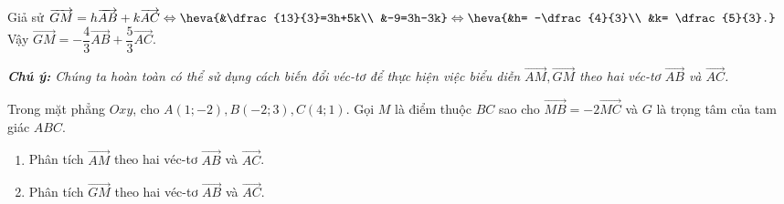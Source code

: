\begin{bt}
{\begin{enumerate}
        Giả sử $\overrightarrow{GM} = h\overrightarrow{AB}+k\overrightarrow{AC} \Leftrightarrow \heva{&\dfrac{13}{3}=3h+5k\\ &-9=3h-3k} \Leftrightarrow \heva{&h= -\dfrac{4}{3}\\ &k= \dfrac{5}{3}.}$\\
        Vậy $\overrightarrow{GM} = -\dfrac{4}{3}\overrightarrow{AB}+\dfrac{5}{3}\overrightarrow{AC}$.
    \end{enumerate} 
    \textit{\textbf{Chú ý:} Chúng ta hoàn toàn có thể sử dụng cách biến đổi véc-tơ để thực hiện việc biểu diễn $\overrightarrow{AM},\overrightarrow{GM}$ theo hai véc-tơ $\overrightarrow{AB}$ và $\overrightarrow{AC}$.}
	}
\end{bt}

\begin{bt}%
	Trong mặt phẳng $Oxy$, cho $A\left(1; -2\right), B\left(-2; 3\right), C\left(4; 1\right)$. Gọi $M$ là điểm thuộc $BC$ sao cho $\overrightarrow{MB}=-2\overrightarrow{MC}$ và $G$ là trọng tâm của tam giác $ABC$.
	\begin{enumerate}
		\item Phân tích $\overrightarrow{AM}$ theo hai véc-tơ $\overrightarrow{AB}$ và $\overrightarrow{AC}$.
		\item Phân tích $\overrightarrow{GM}$ theo hai véc-tơ $\overrightarrow{AB}$ và $\overrightarrow{AC}$.
	\end{enumerate}
\end{bt}
